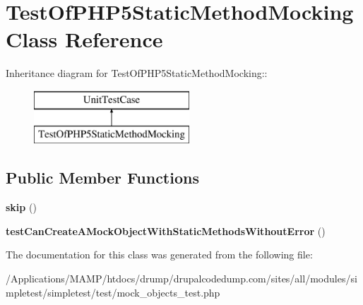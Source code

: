\hypertarget{class_test_of_p_h_p5_static_method_mocking}{
\section{TestOfPHP5StaticMethodMocking Class Reference}
\label{class_test_of_p_h_p5_static_method_mocking}
}
Inheritance diagram for TestOfPHP5StaticMethodMocking::\begin{figure}[H]
\begin{center}
\leavevmode
\includegraphics[height=2cm]{class_test_of_p_h_p5_static_method_mocking}
\end{center}
\end{figure}
\subsection*{Public Member Functions}
\begin{DoxyCompactItemize}
\item 
\hypertarget{class_test_of_p_h_p5_static_method_mocking_a4f917cb215412686dd7766094098bfbd}{
{\bfseries skip} ()}
\label{class_test_of_p_h_p5_static_method_mocking_a4f917cb215412686dd7766094098bfbd}

\item 
\hypertarget{class_test_of_p_h_p5_static_method_mocking_af31116843604fad90d7f057cfe9cc512}{
{\bfseries testCanCreateAMockObjectWithStaticMethodsWithoutError} ()}
\label{class_test_of_p_h_p5_static_method_mocking_af31116843604fad90d7f057cfe9cc512}

\end{DoxyCompactItemize}


The documentation for this class was generated from the following file:\begin{DoxyCompactItemize}
\item 
/Applications/MAMP/htdocs/drump/drupalcodedump.com/sites/all/modules/simpletest/simpletest/test/mock\_\-objects\_\-test.php\end{DoxyCompactItemize}
